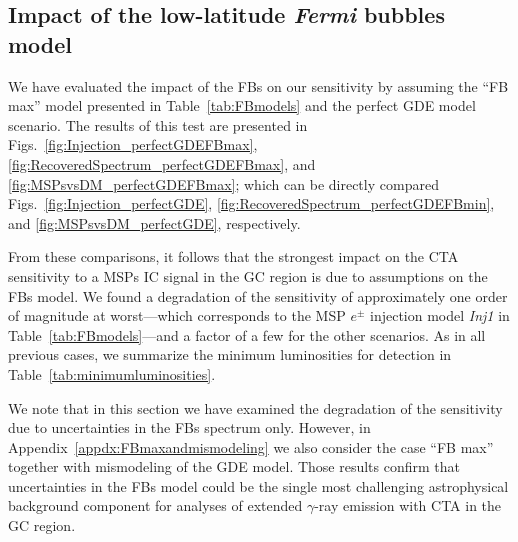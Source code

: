 \documentclass[doublespace,nopageskip]{VTthesis} %
\begin{document}
\subsection{Impact of the low-latitude \textit{Fermi} bubbles model}
\label{subsec:FBsImpact}

 We have evaluated the impact of the FBs on our sensitivity by assuming the ``FB max'' model presented in Table~\ref{tab:FBmodels} and the perfect GDE model scenario. The results of this test are presented in Figs.~\ref{fig:Injection_perfectGDEFBmax}, \ref{fig:RecoveredSpectrum_perfectGDEFBmax}, and \ref{fig:MSPsvsDM_perfectGDEFBmax}; which can be directly compared Figs.~\ref{fig:Injection_perfectGDE}, \ref{fig:RecoveredSpectrum_perfectGDEFBmin}, and \ref{fig:MSPsvsDM_perfectGDE}, respectively. 

From these comparisons, it follows that the strongest impact on the CTA sensitivity to a MSPs IC signal in the GC region is due to assumptions on the FBs model. We found a degradation of the sensitivity of approximately one order of magnitude at worst---which corresponds to the MSP $e^\pm$ injection model \textit{Inj1} in Table~\ref{tab:FBmodels}---and a factor of a few for the other scenarios. As in all previous cases, we summarize the minimum luminosities for detection in Table~\ref{tab:minimumluminosities}.  

We note that in this section we have examined the degradation of the sensitivity due to uncertainties in the FBs spectrum only. However, in Appendix~\ref{appdx:FBmaxandmismodeling} we also consider the case ``FB max'' together with  mismodeling of the GDE model. Those results confirm that uncertainties in the FBs model could be the single most challenging astrophysical background component for analyses of extended $\gamma$-ray emission with CTA in the GC region.     
\end{document}
